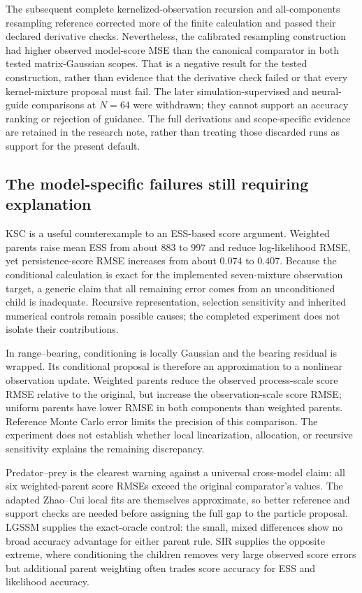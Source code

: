 The subsequent complete kernelized-observation recursion and
all-components resampling reference corrected more of the finite
calculation and passed their declared derivative checks. Nevertheless, the
calibrated resampling construction had higher observed model-score MSE than
the canonical comparator in both tested matrix-Gaussian scopes. That is a
negative result for the tested construction, rather than evidence that the
derivative check failed or that every kernel-mixture proposal must fail.
The later simulation-supervised and neural-guide comparisons at $N=64$
were withdrawn; they cannot support an accuracy ranking or rejection of
guidance. The full derivations and scope-specific evidence are retained in
the research note, rather than treating those discarded runs as support
for the present default.

\subsection{The model-specific failures still requiring explanation}

KSC is a useful counterexample to an ESS-based score argument. Weighted
parents raise mean ESS from about $883$ to $997$ and reduce log-likelihood
RMSE, yet persistence-score RMSE increases from about $0.074$ to $0.407$.
Because the conditional calculation is exact for the implemented
seven-mixture observation target, a generic claim that all remaining error
comes from an unconditioned child is inadequate. Recursive representation,
selection sensitivity and inherited numerical controls remain possible
causes; the completed experiment does not isolate their contributions.

In range--bearing, conditioning is locally Gaussian and the bearing residual
is wrapped. Its conditional proposal is therefore an approximation to a
nonlinear observation update. Weighted parents reduce the observed
process-scale score RMSE relative to the original, but increase the
observation-scale score RMSE; uniform parents have lower RMSE in both
components than weighted parents. Reference Monte Carlo error limits the
precision of this comparison. The experiment does not establish whether
local linearization, allocation, or recursive sensitivity explains the
remaining discrepancy.

Predator--prey is the clearest warning against a universal cross-model
claim: all six weighted-parent score RMSEs exceed the original comparator's
values. The adapted Zhao--Cui local fits are themselves approximate, so
better reference and support checks are needed before assigning the full
gap to the particle proposal. LGSSM supplies the exact-oracle control:
the small, mixed differences show no broad accuracy advantage for either
parent rule. SIR supplies the opposite extreme, where conditioning the
children removes very large observed score errors but additional parent
weighting often trades score accuracy for ESS and likelihood accuracy.

